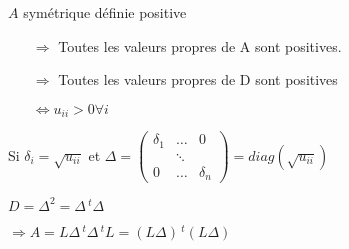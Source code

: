 \documentclass[a4paper,11pt]{article}
\newcommand{\tpo}[1]{\,^t#1}
\theoremstyle{plain} %
\begin{document}
    $A$ symétrique définie positive
    \begin{itemize}
        \item [$\Rightarrow$] Toutes les valeurs propres de A sont positives.
        \item [$\Rightarrow$] Toutes les valeurs propres de D sont positives

            $\Leftrightarrow u_{ii} > 0 \forall i$
    \end{itemize}

    Si $\delta_i = \sqrt{u_{ii}}$ et $\Delta = 
    \begin{pmatrix}
        \delta_1 & \dots & 0 \\
        & \ddots & \\
        0 & \dots & \delta_n
    \end{pmatrix}
    = diag(\sqrt{u_{ii}})$

    $D = \Delta^2 = \Delta \tpo \Delta$

    $\Rightarrow A = L \Delta \tpo \Delta \tpo L = (L\Delta)\tpo (L\Delta)$
\end{document}
